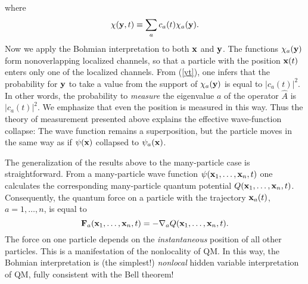 \documentclass[12pt]{article} %
\begin{document}
where
\begin{equation}
\chi({\bf y},t)\equiv \sum_a c_a(t) \chi_a({\bf y}) .
\end{equation}
Now we apply the Bohmian interpretation to both ${\bf x}$ and ${\bf y}$.
The functions $\chi_a({\bf y})$ form nonoverlapping
localized channels, so that a
particle with the position ${\bf x}(t)$ 
enters only one of the localized channels.
From (\ref{yt}), one infers that the probability
for ${\bf y}$ to take a value from the support of $\chi_a({\bf y})$ is
equal to $|c_a(t)|^2$. 
In other words, the probability to {\em measure} the eigenvalue $a$ of the 
operator $\hat{A}$ is $|c_a(t)|^2$. 
We emphasize that even the position is measured in this way. 
Thus the theory of measurement presented above explains the
effective wave-function collapse: 
The wave function remains a superposition, but the particle moves 
in the same way as if $\psi({\bf x})$ collapsed to $\psi_a({\bf x})$. 

The generalization of the results above 
to the many-particle case is straightforward. 
From a many-particle wave function  
$\psi({\bf x}_1, \ldots, {\bf x}_n,t)$ one calculates
the corresponding many-particle quantum potential 
$Q({\bf x}_1, \ldots, {\bf x}_n,t)$.
Consequently, the quantum force on a particle with the trajectory 
${\bf x}_a(t)$, $a=1,\ldots,n$, is equal to
\begin{equation}
{\bf F}_a({\bf x}_1, \ldots, {\bf x}_n,t)=
-\nabla_a Q({\bf x}_1, \ldots, {\bf x}_n,t) .
\end{equation}
The force on one particle depends on the {\em instantaneous} 
position of all other particles. This is a manifestation
of the nonlocality of QM. In this way, the 
Bohmian interpretation is (the simplest!) {\em nonlocal} 
hidden variable interpretation of QM, fully consistent with the Bell theorem! 
\end{document}
